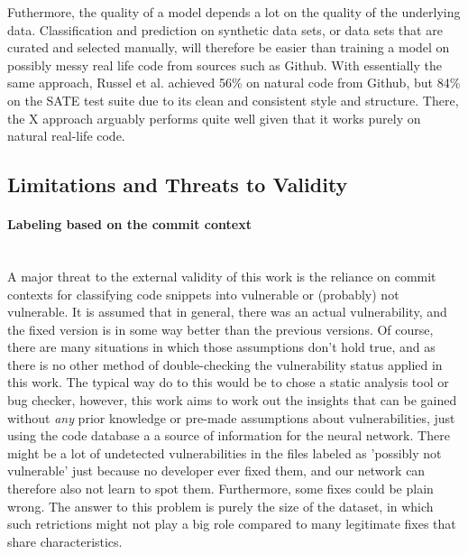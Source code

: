 \documentclass[
	a4paper,
	pagesize,
	pdftex,
	12pt,
	twoside, %
	BCOR=5mm, %
	ngerman,
	fleqn,
	final,
	]{scrartcl}
\begin{document}
Futhermore, the quality of a model depends a lot on the quality of the underlying data. Classification and prediction on synthetic data sets, or data sets that are curated and selected manually, will therefore be easier than training a model on possibly messy real life code from sources such as Github. With essentially the same approach, Russel et al. achieved 56\% on natural code from Github, but 84\% on the SATE test suite due to its clean and consistent style and structure. There, the X approach arguably performs quite well given that it works purely on natural real-life code. 







\subsection{Limitations and Threats to Validity}

\paragraph{Labeling based on the commit context}\mbox{}\\
A major threat to the external validity of this work is the reliance on commit contexts for classifying code snippets into vulnerable or (probably) not vulnerable. It is assumed that in general, there was an actual vulnerability, and the fixed version is in some way better than the previous versions. Of course, there are many situations in which those assumptions don't hold true, and as there is no other method of double-checking the vulnerability status applied in this work. The typical way do to this would be to chose a static analysis tool or bug checker, however, this work aims to work out the insights that can be gained without \textit{any} prior knowledge or pre-made assumptions about vulnerabilities, just using the code database a a source of information for the neural network. There might be a lot of undetected vulnerabilities in the files labeled as 'possibly not vulnerable' just because no developer ever fixed them, and our network can therefore also not learn to spot them. Furthermore, some fixes could be plain wrong. The answer to this problem is purely the size of the dataset, in which such retrictions might not play a big role compared to many legitimate fixes that share characteristics.
\end{document}
